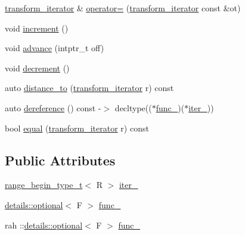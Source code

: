 \begin{DoxyCompactItemize}
\item 
\mbox{\hyperlink{structrah_1_1view_1_1transform__iterator}{transform\+\_\+iterator}} \& \mbox{\hyperlink{structrah_1_1view_1_1transform__iterator_a4589b5fff7d8505b8a569c9d1f863929}{operator=}} (\mbox{\hyperlink{structrah_1_1view_1_1transform__iterator}{transform\+\_\+iterator}} const \&ot)
\item 
void \mbox{\hyperlink{structrah_1_1view_1_1transform__iterator_a1ee5c30f733b63b1cd26baa121389dd1}{increment}} ()
\item 
void \mbox{\hyperlink{structrah_1_1view_1_1transform__iterator_a56c602664659b11bfca3da418c6977be}{advance}} (intptr\+\_\+t off)
\item 
void \mbox{\hyperlink{structrah_1_1view_1_1transform__iterator_a05c99213d071102e793d57b967f7880d}{decrement}} ()
\item 
auto \mbox{\hyperlink{structrah_1_1view_1_1transform__iterator_ae0919c95985ebca42017346da790c981}{distance\+\_\+to}} (\mbox{\hyperlink{structrah_1_1view_1_1transform__iterator}{transform\+\_\+iterator}} r) const
\item 
auto \mbox{\hyperlink{structrah_1_1view_1_1transform__iterator_a8059ce2756def1dcd7c91d5349d2661a}{dereference}} () const -\/$>$ decltype(($\ast$\mbox{\hyperlink{structrah_1_1view_1_1transform__iterator_aaac20c3aa93a6ac347e8c26d8c892ea9}{func\+\_\+}})($\ast$\mbox{\hyperlink{structrah_1_1view_1_1transform__iterator_a349798fe3a741068fd28e50387f39e80}{iter\+\_\+}}))
\item 
bool \mbox{\hyperlink{structrah_1_1view_1_1transform__iterator_a68105373ae5ce99863589e17605f3833}{equal}} (\mbox{\hyperlink{structrah_1_1view_1_1transform__iterator}{transform\+\_\+iterator}} r) const
\end{DoxyCompactItemize}
\subsection*{Public Attributes}
\begin{DoxyCompactItemize}
\item 
\mbox{\hyperlink{namespacerah_a28aff4eeddcece6be65ff0b956d32d4a}{range\+\_\+begin\+\_\+type\+\_\+t}}$<$ R $>$ \mbox{\hyperlink{structrah_1_1view_1_1transform__iterator_a349798fe3a741068fd28e50387f39e80}{iter\+\_\+}}
\item 
\mbox{\hyperlink{structrah_1_1view_1_1details_1_1optional}{details\+::optional}}$<$ F $>$ \mbox{\hyperlink{structrah_1_1view_1_1transform__iterator_aaac20c3aa93a6ac347e8c26d8c892ea9}{func\+\_\+}}
\item 
rah \+::\mbox{\hyperlink{structrah_1_1view_1_1details_1_1optional}{details\+::optional}}$<$ F $>$ \mbox{\hyperlink{structrah_1_1view_1_1transform__iterator_a0916160a830ab134bf224102ae102017}{func\+\_\+}}
\end{DoxyCompactItemize}


